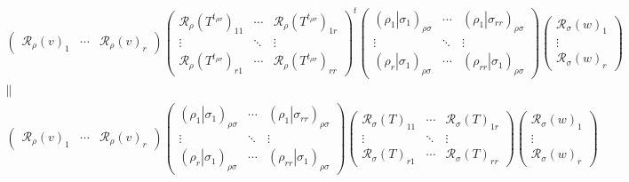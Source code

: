 \documentclass[aps,preprint]{revtex4}
\begin{document}
\begin{gather}
\left( 
\begin{array}{ccc}
\mathcal{R}_{\rho }\left( v\right) _{1} & \cdots & \mathcal{R}_{\rho }\left(
v\right) _{r}%
\end{array}%
\right) \left( 
\begin{array}{ccc}
\mathcal{R}_{\rho }\left( T^{t_{\rho \sigma }}\right) _{11} & \cdots & 
\mathcal{R}_{\rho }\left( T^{t_{\rho \sigma }}\right) _{1r} \\ 
\vdots & \ddots & \vdots \\ 
\mathcal{R}_{\rho }\left( T^{t_{\rho \sigma }}\right) _{r1} & \cdots & 
\mathcal{R}_{\rho }\left( T^{t_{\rho \sigma }}\right) _{rr}%
\end{array}%
\right) ^{t}\left( 
\begin{array}{ccc}
\left( \left. \rho _{1}\right\vert \sigma _{1}\right) _{\rho \sigma } & 
\cdots & \left( \left. \rho _{1}\right\vert \sigma _{rr}\right) _{\rho
\sigma } \\ 
\vdots & \ddots & \vdots \\ 
\left( \left. \rho _{r}\right\vert \sigma _{1}\right) _{\rho \sigma } & 
\cdots & \left( \left. \rho _{rr}\right\vert \sigma _{1}\right) _{\rho
\sigma }%
\end{array}%
\right) \left( 
\begin{array}{c}
\mathcal{R}_{\sigma }\left( w\right) _{1} \\ 
\vdots \\ 
\mathcal{R}_{\sigma }\left( w\right) _{r}%
\end{array}%
\right) \\
\parallel \\
\left( 
\begin{array}{ccc}
\mathcal{R}_{\rho }\left( v\right) _{1} & \cdots & \mathcal{R}_{\rho }\left(
v\right) _{r}%
\end{array}%
\right) \left( 
\begin{array}{ccc}
\left( \left. \rho _{1}\right\vert \sigma _{1}\right) _{\rho \sigma } & 
\cdots & \left( \left. \rho _{1}\right\vert \sigma _{rr}\right) _{\rho
\sigma } \\ 
\vdots & \ddots & \vdots \\ 
\left( \left. \rho _{r}\right\vert \sigma _{1}\right) _{\rho \sigma } & 
\cdots & \left( \left. \rho _{rr}\right\vert \sigma _{1}\right) _{\rho
\sigma }%
\end{array}%
\right) \left( 
\begin{array}{ccc}
\mathcal{R}_{\sigma }\left( T\right) _{11} & \cdots & \mathcal{R}_{\sigma
}\left( T\right) _{1r} \\ 
\vdots & \ddots & \vdots \\ 
\mathcal{R}_{\sigma }\left( T\right) _{r1} & \cdots & \mathcal{R}_{\sigma
}\left( T\right) _{rr}%
\end{array}%
\right) \left( 
\begin{array}{c}
\mathcal{R}_{\sigma }\left( w\right) _{1} \\ 
\vdots \\ 
\mathcal{R}_{\sigma }\left( w\right) _{r}%
\end{array}%
\right)
\end{gather}%
\end{document}
